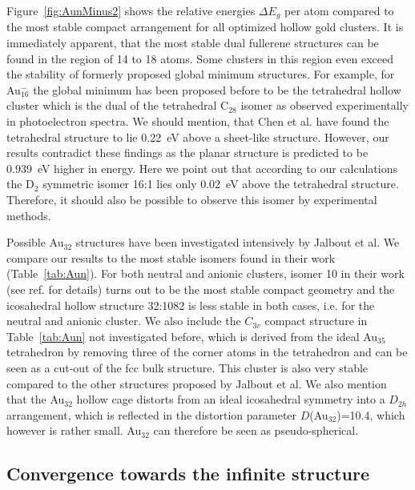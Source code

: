 Figure~\ref{fig:AunMinus2} shows the relative energies $\Delta E_g$ per atom compared to
the most stable compact arrangement for all optimized hollow gold clusters. 
It is immediately apparent, that the most stable dual fullerene
structures can be found in the region of 14 to 18 atoms. Some clusters in this
region even exceed the stability of formerly proposed global minimum
structures. For example, for Au$_{16}^-$ the global minimum has been proposed before to be the tetrahedral hollow
cluster\autocite{Schooss_Determiningsizedependentstructure_2010,Lechtken_Structuredeterminationgold_2009} which is the dual of the tetrahedral
C$_{28}$ isomer as observed experimentally in photoelectron spectra.\autocite{Bulusu_Evidencehollowgolden_2006}
We should mention, that Chen et al. have found the
tetrahedral structure to lie 0.22~eV above a sheet-like
structure.\autocite{Chen_Structuresneutralanionic_2010} However, our results contradict these findings as
the planar structure is predicted to be 0.939~eV higher in energy. 
Here we point out that according to our calculations the D$_2$ symmetric isomer 16:1 lies
only 0.02~eV above the tetrahedral structure.
Therefore, it should also be possible to observe this isomer by experimental methods.

Possible Au$_{32}$ structures have been investigated intensively by Jalbout et
al.\autocite{Jalbout_LowSymmetryStructuresAu_2008} We compare our results to the most stable isomers found
in their work (Table~\ref{tab:Aun}). For both neutral and anionic clusters,
isomer 10 in their work (see ref.\autocite{Jalbout_LowSymmetryStructuresAu_2008} for details) turns out to be 
the most stable compact geometry and the icosahedral hollow
structure 32:1082 is less stable in both cases, i.e. for the neutral and anionic cluster.
We also include the $C_{3v}$ compact structure in Table~\ref{tab:Aun} not
investigated before, which is derived from the ideal Au$_{35}$ tetrahedron by removing
three of the corner atoms in the tetrahedron and can be seen as a cut-out of the
fcc bulk structure. This cluster is also very stable compared to the other structures
proposed by Jalbout et al. We also mention that the Au$_{32}$ hollow cage distorts from an ideal
icosahedral symmetry into a $D_{2h}$ arrangement, which is reflected in the distortion parameter
$D$(Au$_{32}$)=10.4, which however is rather small. Au$_{32}$ can therefore be seen as pseudo-spherical.
  

\subsection{Convergence towards the infinite structure}

